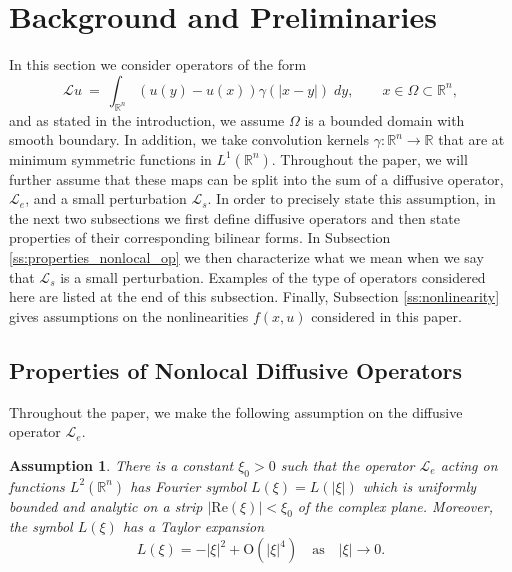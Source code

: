 \documentclass[11pt]{amsart}   	%
\theoremstyle{plain}
\numberwithin{equation}{section}
\newtheorem{assumption}[thm]{Assumption}
\def\R{\mathbb{R}}
\begin{document}

\section{Background and Preliminaries}\label{Sec: Setup}


In this section we consider operators of the form
\begin{equation}\label{e:nonlocal_operator}
\mathcal{L} u \ = \  \int_{\R^n} (u(y) - u(x) ) \gamma(|x-y|) \; dy, \qquad x \in \Omega \subset \R^n,
\end{equation}
and as stated in the introduction, we assume $\Omega$ is a bounded domain with smooth boundary. In addition, we take convolution kernels  $\gamma: \R^n \longrightarrow \R$ that are at minimum symmetric functions in $L^1(\R^n)$. 
Throughout the paper, we will further assume that these maps can be split into the sum of a diffusive operator, $\mathcal{L}_e$, and a small perturbation $\mathcal{L}_s$.
In order to precisely state this assumption, in the next two subsections we first define diffusive operators and then state properties of their corresponding bilinear forms. In Subsection \ref{ss:properties_nonlocal_op} we then characterize what we mean when we say that $\mathcal{L}_s$ is a small perturbation. Examples of the type of operators considered here are listed at the end of this subsection. Finally, Subsection \ref{ss:nonlinearity} gives assumptions on the nonlinearities $f(x,u)$ considered in this paper.



\subsection{Properties of Nonlocal Diffusive Operators}\label{Subsec: PropL}

Throughout the paper, we make the following assumption on the diffusive operator $\mathcal{L}_e$.

\begin{assumption}\label{a:operatorL}
There is a constant $\xi_0>0$ such that the operator $\mathcal{L}_e $ acting on functions $L^2(\R^n) $  has Fourier symbol $L(\xi) = L(|\xi|)$ which is uniformly bounded and analytic on a strip $| \mathrm{Re}(\xi)| < \xi_0$ of the complex plane. Moreover, the symbol $L(\xi)$ has a Taylor expansion
\[ L(\xi) = - |\xi|^2 + \mathrm{O}(|\xi|^4) \quad \text{as} \quad |\xi| \to 0.\]
\end{assumption}
\end{document}
